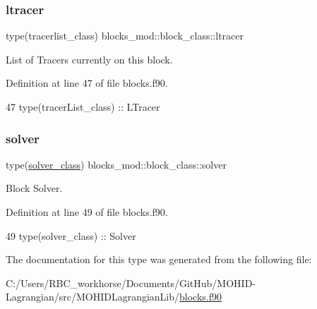 \subsubsection{\texorpdfstring{ltracer}{ltracer}}
{\footnotesize\ttfamily type(tracerlist\+\_\+class) blocks\+\_\+mod\+::block\+\_\+class\+::ltracer\hspace{0.3cm}{\ttfamily [private]}}



List of Tracers currently on this block. 



Definition at line 47 of file blocks.\+f90.


\begin{DoxyCode}
47         \textcolor{keywordtype}{type}(tracerList\_class) :: LTracer
\end{DoxyCode}
\mbox{\label{structblocks__mod_1_1block__class_a081258113128b3bcdefdbeac4bc5d039}} 
\subsubsection{\texorpdfstring{solver}{solver}}
{\footnotesize\ttfamily type(\mbox{\hyperlink{structsolver__mod_1_1solver__class}{solver\+\_\+class}}) blocks\+\_\+mod\+::block\+\_\+class\+::solver\hspace{0.3cm}{\ttfamily [private]}}



Block Solver. 



Definition at line 49 of file blocks.\+f90.


\begin{DoxyCode}
49         \textcolor{keywordtype}{type}(solver\_class)     :: Solver
\end{DoxyCode}


The documentation for this type was generated from the following file\+:\begin{DoxyCompactItemize}
\item 
C\+:/\+Users/\+R\+B\+C\+\_\+workhorse/\+Documents/\+Git\+Hub/\+M\+O\+H\+I\+D-\/\+Lagrangian/src/\+M\+O\+H\+I\+D\+Lagrangian\+Lib/\mbox{\hyperlink{blocks_8f90}{blocks.\+f90}}\end{DoxyCompactItemize}
